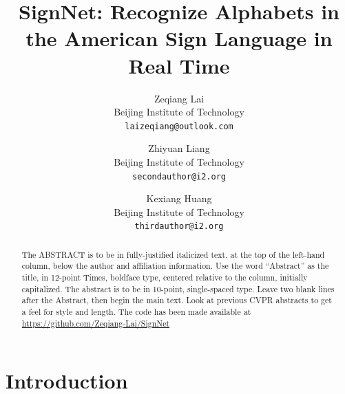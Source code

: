 \documentclass[10pt,twocolumn,letterpaper]{article}
\begin{document}
\title{SignNet: Recognize Alphabets in the American Sign Language in Real Time}

\author{
Zeqiang Lai\\
Beijing Institute of Technology\\
{\tt\small laizeqiang@outlook.com}
\and
Zhiyuan Liang\\
Beijing Institute of Technology\\
{\tt\small secondauthor@i2.org}
\and
Kexiang Huang\\
Beijing Institute of Technology\\
{\tt\small thirdauthor@i2.org}
}

\maketitle

\begin{abstract}
   The ABSTRACT is to be in fully-justified italicized text, at the top
   of the left-hand column, below the author and affiliation
   information. Use the word ``Abstract'' as the title, in 12-point
   Times, boldface type, centered relative to the column, initially
   capitalized. The abstract is to be in 10-point, single-spaced type.
   Leave two blank lines after the Abstract, then begin the main text.
   Look at previous CVPR abstracts to get a feel for style and length.
   The code has been made available at \url{https://github.com/Zeqiang-Lai/SignNet}
\end{abstract}

\section{Introduction}

\blindtext
\end{document}
